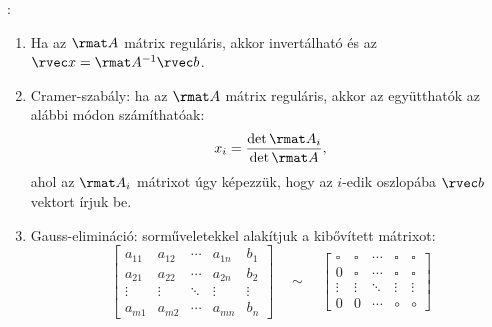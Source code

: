 \clearpage
\begin{blueBox}
  :

  \begin{enumerate}
    \item Ha az $\rmat A$ mátrix reguláris, akkor invertálható és az
          $\rvec x = \rmat A^{-1} \rvec b$.

    \item Cramer-szabály: ha az $\rmat A$ mátrix reguláris, akkor az
          együtthatók az alábbi módon számíthatóak:
          $$
            x_i = \frac{\det \rmat A_i}{\det \rmat A}
            \text,
          $$
          ahol az $\rmat A_i$ mátrixot úgy képezzük, hogy az $i$-edik oszlopába
          $\rvec b$ vektort írjuk be.

    \item Gauss-elimináció: sorműveletekkel alakítjuk a kibővített mátrixot:
          $$
            \left[\begin{array}{cccc|c}
                a_{11} & a_{12} & \cdots & a_{1n} & b_1    \\
                a_{21} & a_{22} & \cdots & a_{2n} & b_2    \\
                \vdots & \vdots & \ddots & \vdots & \vdots \\
                a_{m1} & a_{m2} & \cdots & a_{mn} & b_n
              \end{array}\right]
            \quad\sim\quad
            \left[\begin{array}{cccc|c}
                \square & \square & \cdots & \square & \square \\
                0       & \square & \cdots & \square & \square \\
                \vdots  & \vdots  & \ddots & \vdots  & \vdots  \\
                0       & 0       & \cdots & \circ   & \circ
              \end{array}\right]
          $$
  \end{enumerate}
\end{blueBox}